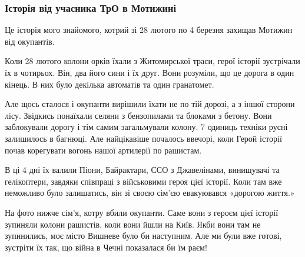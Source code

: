 
 
 
 
 

\subsubsection{Історія від учасника ТрО в Мотижині}

Це історія мого знайомого, котрий зі 28 лютого по 4 березня захищав Мотижин від
окупантів.

Коли 28 лютого колони орків їхали з Житомирської траси, герої історії
зустрічали їх в чотирьох. Він, два його сини і їх друг. Вони розуміли, що це
дорога в один кінець. В них було декілька автоматів та один гранатомет.

Але щось сталося і окупанти вирішили їхати не по тій дорозі, а з іншої сторони
лісу. Звідкись понаїхали селяни з бензопилами та блоками з бетону. Вони
заблокували дорогу і тім самим загальмували колону. 7 одиниць техніки русні
залишилось в багнюці. Але найцікавіше почалось ввечорі, коли Герой історії
почав корегувати вогонь нашої артилерії по рашистам.

В ці 4 дні їх валили Піони, Байрактари, ССО з Джавелінами, винищувачі та
гелікоптери, завдяки співпраці з військовими героя цієї історії. Коли там вже
неможливо було залишатись, він зі своєю сім'єю евакуювався «дорогою життя.»

На фото нижче сім'я, котру вбили окупанти. Саме вони з героєм цієї історії
зупиняли колони рашистів, коли вони йшли на Київ. Якби вони там не зупинились,
моє місто Вишневе було би наступним. Але ми були вже готові, зустріти їх так,
що війна в Чечні показалася би їм раєм!
